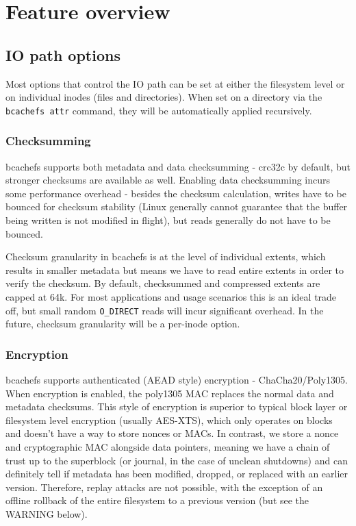\documentclass{article}
\begin{document}
\section{Feature overview}

\subsection{IO path options}

Most options that control the IO path can be set at either the filesystem level
or on individual inodes (files and directories). When set on a directory via the
\texttt{bcachefs attr} command, they will be automatically applied recursively.

\subsubsection{Checksumming}

bcachefs supports both metadata and data checksumming - crc32c by default, but
stronger checksums are available as well. Enabling data checksumming incurs some
performance overhead - besides the checksum calculation, writes have to be
bounced for checksum stability (Linux generally cannot guarantee that the buffer
being written is not modified in flight), but reads generally do not have to be
bounced.

Checksum granularity in bcachefs is at the level of individual extents, which
results in smaller metadata but means we have to read entire extents in order to
verify the checksum. By default, checksummed and compressed extents are capped
at 64k. For most applications and usage scenarios this is an ideal trade off, but
small random \texttt{O\_DIRECT} reads will incur significant overhead. In the
future, checksum granularity will be a per-inode option.

\subsubsection{Encryption}

bcachefs supports authenticated (AEAD style) encryption - ChaCha20/Poly1305.
When encryption is enabled, the poly1305 MAC replaces the normal data and
metadata checksums. This style of encryption is superior to typical block layer
or filesystem level encryption (usually AES-XTS), which only operates on blocks
and doesn't have a way to store nonces or MACs. In contrast, we store a nonce
and cryptographic MAC alongside data pointers, meaning we have a chain of trust
up to the superblock (or journal, in the case of unclean shutdowns) and can
definitely tell if metadata has been modified, dropped, or replaced with an
earlier version.  Therefore, replay attacks are not possible, with the exception
of an offline rollback of the entire filesystem to a previous version (but see
the WARNING below).
\end{document}
